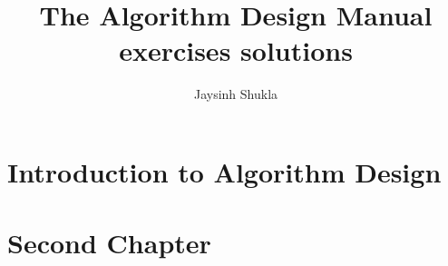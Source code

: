 \documentclass{book}
\title{The Algorithm Design Manual exercises solutions}
\author{Jaysinh Shukla}
\begin{document}
  \maketitle
  \mainmatter
  \chapter{Introduction to Algorithm Design}
    
  \chapter{Second Chapter}
\end{document}
